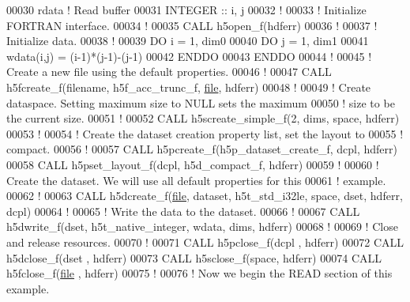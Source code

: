 \begin{DoxyCode}
00030                                         rdata    \textcolor{comment}{! Read buffer}
00031   \textcolor{keywordtype}{INTEGER} :: i, j
00032   \textcolor{comment}{!}
00033   \textcolor{comment}{! Initialize FORTRAN interface.}
00034   \textcolor{comment}{!}
00035   \textcolor{keyword}{CALL }h5open\_f(hdferr)
00036   \textcolor{comment}{!}
00037   \textcolor{comment}{! Initialize data.}
00038   \textcolor{comment}{!}
00039   \textcolor{keywordflow}{DO} i = 1, dim0
00040      \textcolor{keywordflow}{DO} j = 1, dim1
00041         wdata(i,j) = (i-1)*(j-1)-(j-1)
00042 \textcolor{keywordflow}{     ENDDO}
00043 \textcolor{keywordflow}{  ENDDO}
00044   \textcolor{comment}{!}
00045   \textcolor{comment}{! Create a new file using the default properties.}
00046   \textcolor{comment}{!}
00047   \textcolor{keyword}{CALL }h5fcreate\_f(filename, h5f\_acc\_trunc\_f, \hyperlink{structfile}{file}, hdferr)
00048   \textcolor{comment}{!}
00049   \textcolor{comment}{! Create dataspace.  Setting maximum size to NULL sets the maximum}
00050   \textcolor{comment}{! size to be the current size.}
00051   \textcolor{comment}{!}
00052   \textcolor{keyword}{CALL }h5screate\_simple\_f(2, dims, space, hdferr)
00053   \textcolor{comment}{!}
00054   \textcolor{comment}{! Create the dataset creation property list, set the layout to}
00055   \textcolor{comment}{! compact.}
00056   \textcolor{comment}{!}
00057   \textcolor{keyword}{CALL }h5pcreate\_f(h5p\_dataset\_create\_f, dcpl, hdferr)
00058   \textcolor{keyword}{CALL }h5pset\_layout\_f(dcpl, h5d\_compact\_f, hdferr)
00059   \textcolor{comment}{!}
00060   \textcolor{comment}{! Create the dataset.  We will use all default properties for this}
00061   \textcolor{comment}{! example.}
00062   \textcolor{comment}{!}
00063   \textcolor{keyword}{CALL }h5dcreate\_f(\hyperlink{structfile}{file}, dataset, h5t\_std\_i32le, space, dset, hdferr, dcpl)
00064   \textcolor{comment}{!}
00065   \textcolor{comment}{! Write the data to the dataset.}
00066   \textcolor{comment}{!}
00067   \textcolor{keyword}{CALL }h5dwrite\_f(dset, h5t\_native\_integer, wdata, dims, hdferr)
00068   \textcolor{comment}{!}
00069   \textcolor{comment}{! Close and release resources.}
00070   \textcolor{comment}{!}
00071   \textcolor{keyword}{CALL }h5pclose\_f(dcpl , hdferr)
00072   \textcolor{keyword}{CALL }h5dclose\_f(dset , hdferr)
00073   \textcolor{keyword}{CALL }h5sclose\_f(space, hdferr)
00074   \textcolor{keyword}{CALL }h5fclose\_f(\hyperlink{structfile}{file} , hdferr)
00075   \textcolor{comment}{!}
00076   \textcolor{comment}{! Now we begin the READ section of this example.}

\end{DoxyCode}
